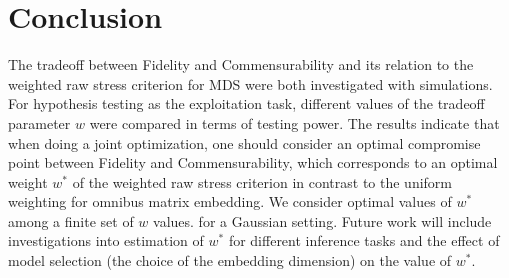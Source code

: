 \documentclass[12pt]{article} %
\begin{document}

\section{Conclusion}
 The tradeoff between Fidelity and Commensurability and its relation to the weighted raw stress criterion for MDS were both investigated with simulations.
   For  hypothesis testing as the exploitation task, different values of the tradeoff parameter $w$ were compared in terms of testing power.
    The results indicate that when doing a joint optimization, one should consider an optimal compromise point between Fidelity and Commensurability,
       which corresponds to an optimal weight $w^*$ of the weighted raw stress criterion in contrast to the uniform weighting 
        for omnibus matrix embedding. We consider optimal values of $w^*$  among a finite set of $w$ values. for a Gaussian setting. Future work will include investigations into estimation of $w^*$  for different inference tasks and the effect of model selection (the choice of the embedding dimension) on the value of $w^*$. 
        




\end{document}

